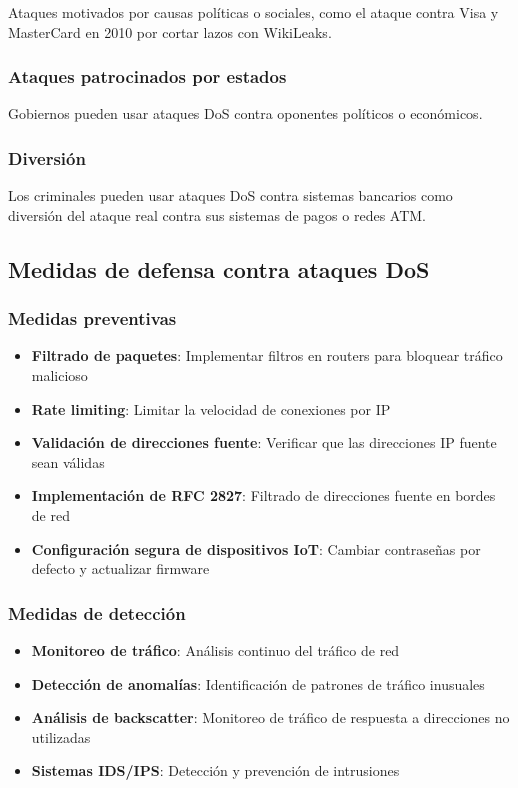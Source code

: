 Ataques motivados por causas políticas o sociales, como el ataque contra Visa y MasterCard en 2010 por cortar lazos con WikiLeaks.

\subsubsection{Ataques patrocinados por estados}

Gobiernos pueden usar ataques DoS contra oponentes políticos o económicos.

\subsubsection{Diversión}

Los criminales pueden usar ataques DoS contra sistemas bancarios como diversión del ataque real contra sus sistemas de pagos o redes ATM.

\subsection{Medidas de defensa contra ataques DoS}

\subsubsection{Medidas preventivas}

\begin{itemize}
    \item \textbf{Filtrado de paquetes}: Implementar filtros en routers para bloquear tráfico malicioso
    \item \textbf{Rate limiting}: Limitar la velocidad de conexiones por IP
    \item \textbf{Validación de direcciones fuente}: Verificar que las direcciones IP fuente sean válidas
    \item \textbf{Implementación de RFC 2827}: Filtrado de direcciones fuente en bordes de red
    \item \textbf{Configuración segura de dispositivos IoT}: Cambiar contraseñas por defecto y actualizar firmware
\end{itemize}

\subsubsection{Medidas de detección}

\begin{itemize}
    \item \textbf{Monitoreo de tráfico}: Análisis continuo del tráfico de red
    \item \textbf{Detección de anomalías}: Identificación de patrones de tráfico inusuales
    \item \textbf{Análisis de backscatter}: Monitoreo de tráfico de respuesta a direcciones no utilizadas
    \item \textbf{Sistemas IDS/IPS}: Detección y prevención de intrusiones
\end{itemize}

